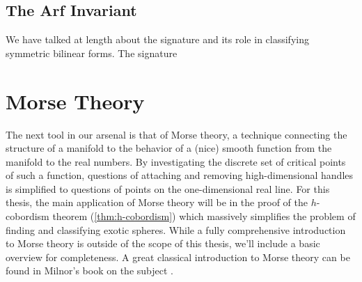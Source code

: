 \begin{definition}
\end{definition}

\medskip
{}


\subsection{The Arf Invariant}\label{sec:arf-invariant}

We have talked at length about the signature and its role in classifying symmetric bilinear forms. The signature

\begin{definition}
\end{definition}

\pagebreak
\section{Morse Theory}\label{sec:morse-theory}

The next tool in our arsenal is that of Morse theory, a technique connecting the structure of a manifold to the behavior of a (nice) smooth function from the manifold to the real numbers. 
By investigating the discrete set of critical points of such a function, questions of attaching and removing high-dimensional handles is simplified to questions of points on the one-dimensional real line. For this thesis, the main application of Morse theory will be in the proof of the $h$-cobordism theorem (\cref{thm:h-cobordism}) which massively simplifies the problem of finding and classifying exotic spheres. While a fully comprehensive introduction to Morse theory is outside of the scope of this thesis, we'll include a basic overview for completeness. A great classical introduction to Morse theory can be found in Milnor's book on the subject \cite{milnor1963morse}.


